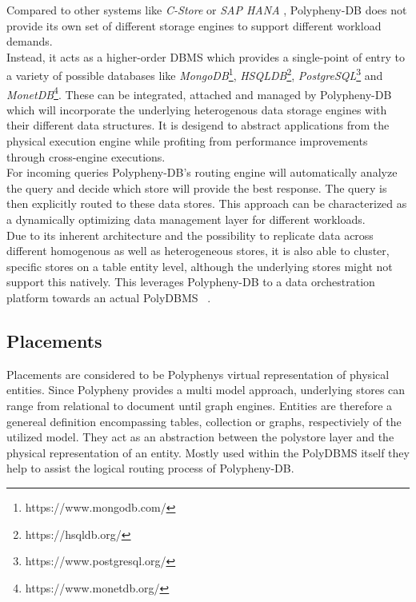 Compared to other systems like \textit{C-Store}\cite{cstore_2005} or \textit{SAP HANA} \cite{hana_2012}, 
Polypheny-DB does not provide its own set of different storage engines to support 
different workload demands.\\
Instead, it acts as a higher-order DBMS which provides a single-point of entry to 
a variety of possible databases like 
\textit{MongoDB}\footnote{https://www.mongodb.com/}, 
\textit{HSQLDB}\footnote{https://hsqldb.org/},
\textit{PostgreSQL}\footnote{https://www.postgresql.org/} 
and \textit{MonetDB}\footnote{https://www.monetdb.org/}. 
These can be integrated, attached and managed by Polypheny-DB which will incorporate the underlying 
heterogenous data storage engines with their different data structures. 
It is desigend to abstract applications from the physical execution engine while profiting from 
performance improvements through cross-engine executions. 
\\
For incoming queries Polypheny-DB's routing engine will automatically analyze the query and decide 
which store will provide the best response. The query is then explicitly routed to these data stores. 
This approach can be characterized as a dynamically optimizing data management layer for different workloads.\\
Due to its inherent architecture and the possibility to replicate data across different homogenous as well as heterogeneous stores, it is also able to cluster, specific stores 
on a table entity level, although the underlying stores might not support this natively. 
This leverages Polypheny-DB to a data orchestration platform towards an actual PolyDBMS ~\cite{polypheny2021}. 




\subsection{Placements}
Placements are considered to be Polyphenys virtual representation of physical entities.
Since Polypheny provides a multi model approach, underlying stores can range from relational to document until graph engines. 
Entities are therefore a genereal definition encompassing tables, collection or graphs, respectiviely of the utilized model.
They act as an abstraction between the polystore layer and the physical representation of an entity. 
Mostly used within the PolyDBMS itself they help to assist the logical routing process of Polypheny-DB.


